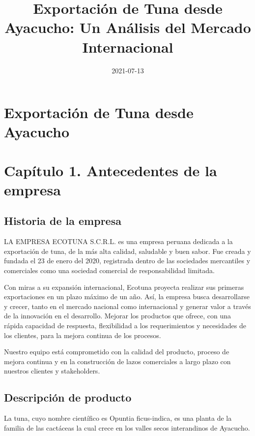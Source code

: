 \documentclass[
  stu,
  floatsintext,
  longtable,
  a4paper,
  nolmodern,
  notxfonts,
  notimes,
  colorlinks=true,linkcolor=blue,citecolor=blue,urlcolor=blue]{apa7}
\title{Exportación de Tuna desde Ayacucho: Un Análisis del Mercado
Internacional}
\affiliation{
{Economía, Universidad Nacional de San Cristóbal de Huamanga}}
\date{2021-07-13}
\begin{document}
\maketitle

\hypertarget{toc}{}
\tableofcontents
\newpage
\section[Introduction]{Exportación de Tuna desde Ayacucho}

\setcounter{secnumdepth}{-\maxdimen} %

\setlength\LTleft{0pt}


\section{Capítulo 1. Antecedentes de la
empresa}\label{capuxedtulo-1.-antecedentes-de-la-empresa}

\subsection{Historia de la empresa}\label{historia-de-la-empresa}

LA EMPRESA ECOTUNA S.C.R.L. es una empresa peruana dedicada a la
exportación de tuna, de la más alta calidad, saludable y buen sabor. Fue
creada y fundada el 23 de enero del 2020, registrada dentro de las
sociedades mercantiles y comerciales como una sociedad comercial de
responsabilidad limitada.

Con miras a su expansión internacional, Ecotuna proyecta realizar sus
primeras exportaciones en un plazo máximo de un año. Así, la empresa
busca desarrollarse y crecer, tanto en el mercado nacional como
internacional y generar valor a través de la innovación en el
desarrollo. Mejorar los productos que ofrece, con una rápida capacidad
de respuesta, flexibilidad a los requerimientos y necesidades de los
clientes, para la mejora continua de los procesos.

Nuestro equipo está comprometido con la calidad del producto, proceso de
mejora continua y en la construcción de lazos comerciales a largo plazo
con nuestros clientes y stakeholders.

\subsection{Descripción de producto}\label{descripciuxf3n-de-producto}

La tuna, cuyo nombre científico es Opuntia ficus-indica, es una planta
de la familia de las cactáceas la cual crece en los valles secos
interandinos de Ayacucho.
\end{document}
